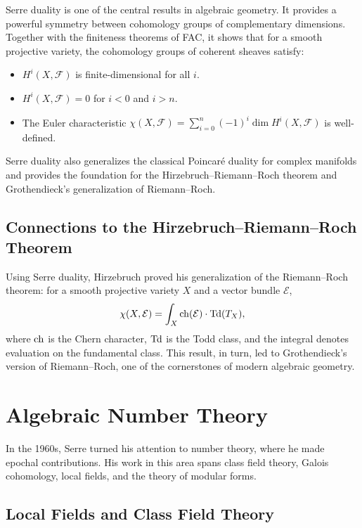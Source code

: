 Serre duality is one of the central results in algebraic geometry. It provides a powerful symmetry between cohomology groups of complementary dimensions. Together with the finiteness theorems of FAC, it shows that for a smooth projective variety, the cohomology groups of coherent sheaves satisfy:

\begin{itemize}
    \item \(H^i(X, \mathcal{F})\) is finite-dimensional for all \(i\).
    \item \(H^i(X, \mathcal{F}) = 0\) for \(i < 0\) and \(i > n\).
    \item The Euler characteristic \(\chi(X, \mathcal{F}) = \sum_{i=0}^n (-1)^i \dim H^i(X, \mathcal{F})\) is well-defined.
\end{itemize}

Serre duality also generalizes the classical Poincar\'e duality for complex manifolds and provides the foundation for the Hirzebruch--Riemann--Roch theorem and Grothendieck's generalization of Riemann--Roch.

\subsection{Connections to the Hirzebruch--Riemann--Roch Theorem}

Using Serre duality, Hirzebruch proved his generalization of the Riemann--Roch theorem: for a smooth projective variety \(X\) and a vector bundle \(\mathcal{E}\),
\[
\chi(X, \mathcal{E}) = \int_X \operatorname{ch}(\mathcal{E}) \cdot \operatorname{Td}(T_X),
\]
where \(\operatorname{ch}\) is the Chern character, \(\operatorname{Td}\) is the Todd class, and the integral denotes evaluation on the fundamental class. This result, in turn, led to Grothendieck's version of Riemann--Roch, one of the cornerstones of modern algebraic geometry.

\section{Algebraic Number Theory}

In the 1960s, Serre turned his attention to number theory, where he made epochal contributions. His work in this area spans class field theory, Galois cohomology, local fields, and the theory of modular forms.

\subsection{Local Fields and Class Field Theory}

